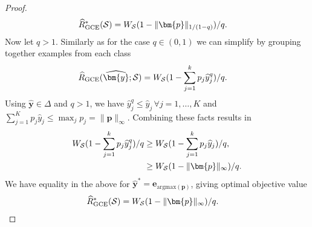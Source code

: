 \documentclass[letterpaper]{article} %
\newcommand{\bx}{{\bm{x}}}
\newcommand{\bp}{{\bm{p}}}
\newcommand{\by}{{\bm{y}}}
\newcommand{\be}{{\bm{e}}}
\newcommand{\T}{{\mathsf{T}}}
\newcommand{\cS}{{\cal{S}}}
\newcommand{\WS}{{W_{\cal{S}}}}
\newcommand{\simplex}{\Delta}
\newcommand{\argmax}{\mathrm{argmax}}
\begin{document}
\begin{proof}
    \begin{align*}
        \widehat{R}_{\mathrm{GCE}}^*(\cS)
        &= \WS(1-\|\bp\|_{1/(1-q)})/q.
    \end{align*}
    Now let $q>1$. Similarly as for the case $q\in(0,1)$ we can simplify by grouping together examples from each class
    \begin{align*}
        \widehat{R}_{\mathrm{GCE}}(\widehat{\by};\cS)
        &= \WS(1-\sum_{j=1}^k p_j\widehat{y}_j^q)/q.
    \end{align*}
    Using $\widehat{\by} \in \simplex$ and $q>1$, we have $\widehat{y}_j^q\leq \widehat{y}_j\,\forall j=1,\ldots,K$ and
    $\sum_{j=1}^K p_j\widehat{y}_j\leq \max_{j}p_j=\|\bp\|_\infty$. Combining these facts results in
    \begin{align*}
        \WS(1-\sum_{j=1}^k p_j\widehat{y}_j^q)/q
        &\geq \WS(1-\sum_{j=1}^k p_j\widehat{y}_j)/q,
        \\
        &\geq \WS(1-\|\bp\|_\infty )/q.%
    \end{align*}
    We have equality in the above for $\widehat{\by}^*=\be_{\argmax(\bp)}$, giving optimal objective value
    \begin{align*}
        \widehat{R}_{\mathrm{GCE}}^*(\cS) &= \WS(1-\|\bp\|_\infty)/q.
    \end{align*}


\end{proof}
\end{document}
